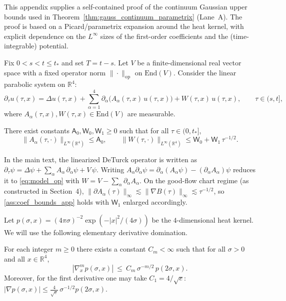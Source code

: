 \label{app:kernel_parametrix}

This appendix supplies a self-contained proof of the continuum Gaussian upper bounds used in Theorem~\ref{thm:gauss_continuum_parametrix} (Lane~A).
The proof is based on a Picard/parametrix expansion around the heat kernel, with explicit dependence on the $L^\infty$ sizes of
the first-order coefficients and the (time-integrable) potential.

Fix $0<s<t\le t_\ast$ and set $T=t-s$.
Let $V$ be a finite-dimensional real vector space with a fixed operator norm $\|\cdot\|_{\mathrm{op}}$ on $\mathrm{End}(V)$.
Consider the linear parabolic system on $\mathbb R^4$:
\begin{equation}\label{eq:model_op}
\partial_\tau u(\tau,x)=\Delta u(\tau,x) + \sum_{\alpha=1}^4 \partial_\alpha\big(A_\alpha(\tau,x)\,u(\tau,x)\big) + W(\tau,x)\,u(\tau,x),
\qquad \tau\in(s,t],
\end{equation}
where $A_\alpha(\tau,x),W(\tau,x)\in\mathrm{End}(V)$ are measurable.

\begin{proposition}\label{ass:coef_bounds_app}
There exist constants $\mathsf A_0,\mathsf W_0,\mathsf W_1\ge 0$ such that for all $\tau\in(0,t_\ast]$,
\[
\|A_\alpha(\tau,\cdot)\|_{L^\infty(\mathbb R^4)}\le \mathsf A_0,\qquad
\|W(\tau,\cdot)\|_{L^\infty(\mathbb R^4)}\le \mathsf W_0+\mathsf W_1\,\tau^{-1/2}.
\]
\end{proposition}

\begin{remark}
In the main text, the linearized DeTurck operator is written as
$\partial_\tau \psi=\Delta\psi+\sum_\alpha A_\alpha\,\partial_\alpha\psi+V\,\psi$.
Writing $A_\alpha\partial_\alpha\psi=\partial_\alpha(A_\alpha\psi)-(\partial_\alpha A_\alpha)\psi$
reduces it to \eqref{eq:model_op} with $W=V-\sum_\alpha\partial_\alpha A_\alpha$.
On the good-flow chart regime (as constructed in Section~4), $\|\partial A_\alpha(\tau)\|_\infty\lesssim \|\nabla B(\tau)\|_\infty\lesssim \tau^{-1/2}$,
so \ref{ass:coef_bounds_app} holds with $\mathsf W_1$ enlarged accordingly.
\end{remark}

Let $p(\sigma,x)=(4\pi\sigma)^{-2}\exp(-|x|^2/(4\sigma))$ be the $4$-dimensional heat kernel.
We will use the following elementary derivative domination.

\begin{lemma}\label{lem:heat_deriv_dom}
For each integer $m\ge 0$ there exists a constant $C_m<\infty$ such that for all $\sigma>0$ and all $x\in\mathbb R^4$,
\begin{equation}\label{eq:heat_deriv_dom}
|\nabla_x^m p(\sigma,x)|\ \le\ C_m\,\sigma^{-m/2}\, p(2\sigma,x).
\end{equation}
Moreover, for the first derivative one may take $C_1=4/\sqrt{e}$:
$|\nabla p(\sigma,x)|\le \frac{4}{\sqrt e}\,\sigma^{-1/2}p(2\sigma,x)$.
\end{lemma}

